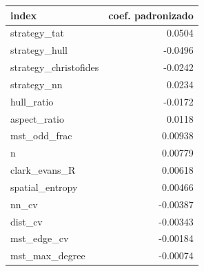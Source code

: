 \begin{tabular}{lr}
\hline
index & coef. padronizado \\
\hline
strategy\_tat & 0.0504 \\
strategy\_hull & -0.0496 \\
strategy\_christofides & -0.0242 \\
strategy\_nn & 0.0234 \\
hull\_ratio & -0.0172 \\
aspect\_ratio & 0.0118 \\
mst\_odd\_frac & 0.00938 \\
n & 0.00779 \\
clark\_evans\_R & 0.00618 \\
spatial\_entropy & 0.00466 \\
nn\_cv & -0.00387 \\
dist\_cv & -0.00343 \\
mst\_edge\_cv & -0.00184 \\
mst\_max\_degree & -0.00074 \\
\hline
\end{tabular}

